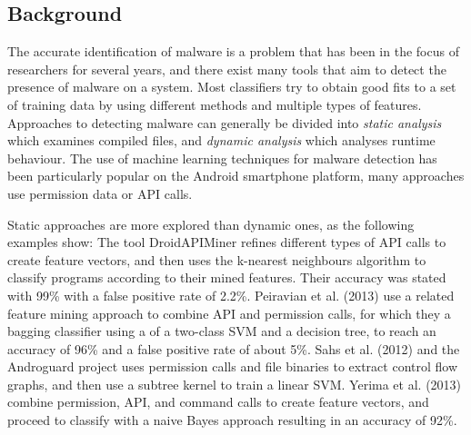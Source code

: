 \documentclass[11pt]{article}
\begin{document}
\subsection{Background}

The accurate identification of malware is a problem that has been in the focus of researchers for several years, and there exist many tools that aim to detect  the presence of malware on a system. Most classifiers   try  to  obtain  good  fits  to a set of training data  by using different methods and multiple types of features. Approaches to detecting malware can generally be divided into \textit{static analysis} which examines compiled files, and \textit{dynamic analysis} which analyses runtime behaviour. The use of machine learning techniques for malware detection has been particularly popular on the Android smartphone platform, many approaches use permission data or API calls. 


Static approaches are more explored than dynamic ones, as the following examples show: The tool DroidAPIMiner \cite{aafer2013droidapiminer} refines different types of API calls  to create feature vectors, and then uses the k-nearest neighbours algorithm to classify programs according to their mined features. Their accuracy was stated with 99\% with a false positive rate of 2.2\%. Peiravian et al. (2013) \cite{peiravian2013machine} use a related feature mining approach to combine API and permission calls, for which they a bagging classifier using a of a two-class SVM and a decision tree, to reach an accuracy of 96\% and a false positive rate of about 5\%. Sahs et al. (2012) \cite{sahs2012machine} and the Androguard project uses permission calls and file binaries to extract control flow graphs, and then use a subtree kernel to train a linear SVM. Yerima et al. (2013) \cite{yerima2013new} combine permission, API, and command calls to create feature vectors, and proceed to classify with a naive Bayes approach resulting in an accuracy of 92\%. 
\end{document}
